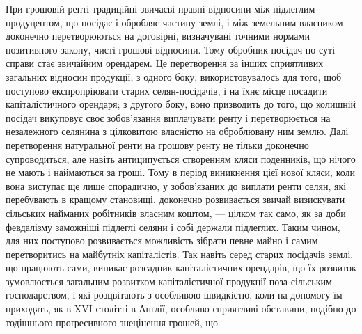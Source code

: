 При грошовій ренті традиційні звичаєві-правні відносини між підлеглим
продуцентом, що посідає і обробляє частину землі, і між земельним
власником доконечно перетворюються на договірні, визначувані точними нормами
позитивного закону, чисті грошові відносини. Тому обробник-посідач по
суті справи стає звичайним орендарем. Це перетворення за інших сприятливих
загальних відносин продукції, з одного боку, використовувалось для того, щоб поступово
експропріювати старих селян-посідачів, і на їхнє місце посадити капіталістичного
орендаря; з другого боку, воно призводить до того, що колишній
посідач викуповує своє зобов’язання виплачувати ренту і перетворюється на незалежного
селянина з цілковитою власністю на оброблювану ним землю. Далі
перетворення натуральної ренти на грошову ренту не тільки доконечно супроводиться,
але навіть антиципується створенням кляси поденників, що нічого
не мають і наймаються за гроші. Тому в період виникнення цієї нової кляси,
коли вона виступає ще лише спорадично, у зобов’язаних до виплати ренти
селян, які перебувають в кращому становищі, доконечно розвивається звичай
визискувати сільських найманих робітників власним коштом, — цілком так само,
як за доби февдалізму заможніші підлеглі селяни і собі держали підлеглих.
Таким чином, для них поступово розвивається можливість зібрати певне майно
і самим перетворитись на майбутніх капіталістів. Так навіть серед старих посідачів
землі, що працюють сами, виникає розсадник капіталістичних орендарів,
що їх розвиток зумовлюється загальним розвитком капіталістичної продукції
поза сільським господарством, і які розцвітають з особливою швидкістю, коли
на допомогу їм приходять, як в XVI столітті в Англії, особливо сприятливі
обставини, подібно до тодішнього проґресивного знецінення грошей, що
\parbreak{}  %
